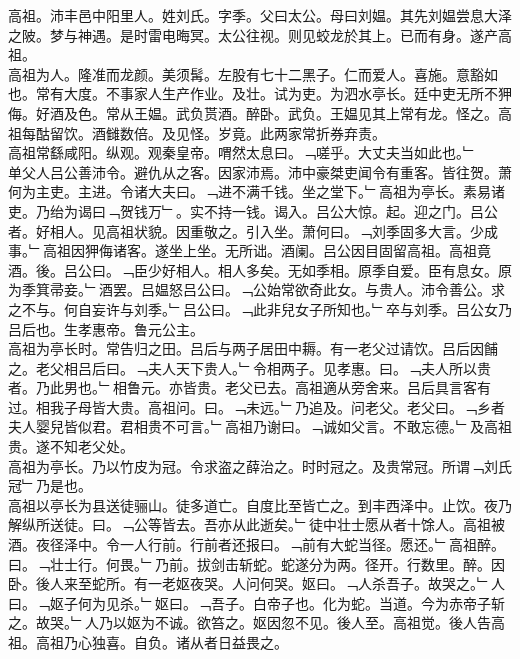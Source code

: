 \documentclass{zhvt-classic}
\begin{document}
\hspace*{2em}高祖。沛丰邑中阳里人。姓刘氏。字季。父曰太公。母曰刘媪。其先刘媪尝息大泽之陂。梦与神遇。是时雷电晦冥。太公往视。则见蛟龙於其上。已而有身。遂产高祖。\\
\hspace*{2em}高祖为人。隆准而龙颜。美须髯。左股有七十二黑子。仁而爱人。喜施。意豁如也。常有大度。不事家人生产作业。及壮。试为吏。为泗水亭长。廷中吏无所不狎侮。好酒及色。常从王媪。武负贳酒。醉卧。武负。王媪见其上常有龙。怪之。高祖每酤留饮。酒雠数倍。及见怪。岁竟。此两家常折券弃责。\\
\hspace*{2em}高祖常繇咸阳。纵观。观秦皇帝。喟然太息曰。﹁嗟乎。大丈夫当如此也。﹂\\
\hspace*{2em}单父人吕公善沛令。避仇从之客。因家沛焉。沛中豪桀吏闻令有重客。皆往贺。萧何为主吏。主进。令诸大夫曰。﹁进不满千钱。坐之堂下。﹂高祖为亭长。素易诸吏。乃绐为谒曰﹁贺钱万﹂。实不持一钱。谒入。吕公大惊。起。迎之门。吕公者。好相人。见高祖状貌。因重敬之。引入坐。萧何曰。﹁刘季固多大言。少成事。﹂高祖因狎侮诸客。遂坐上坐。无所诎。酒阑。吕公因目固留高祖。高祖竟酒。後。吕公曰。﹁臣少好相人。相人多矣。无如季相。原季自爱。臣有息女。原为季箕帚妾。﹂酒罢。吕媪怒吕公曰。﹁公始常欲奇此女。与贵人。沛令善公。求之不与。何自妄许与刘季。﹂吕公曰。﹁此非兒女子所知也。﹂卒与刘季。吕公女乃吕后也。生孝惠帝。鲁元公主。\\
\hspace*{2em}高祖为亭长时。常告归之田。吕后与两子居田中耨。有一老父过请饮。吕后因餔之。老父相吕后曰。﹁夫人天下贵人。﹂令相两子。见孝惠。曰。﹁夫人所以贵者。乃此男也。﹂相鲁元。亦皆贵。老父已去。高祖適从旁舍来。吕后具言客有过。相我子母皆大贵。高祖问。曰。﹁未远。﹂乃追及。问老父。老父曰。﹁乡者夫人婴兒皆似君。君相贵不可言。﹂高祖乃谢曰。﹁诚如父言。不敢忘德。﹂及高祖贵。遂不知老父处。\\
\hspace*{2em}高祖为亭长。乃以竹皮为冠。令求盗之薛治之。时时冠之。及贵常冠。所谓﹁刘氏冠﹂乃是也。\\
\hspace*{2em}高祖以亭长为县送徒骊山。徒多道亡。自度比至皆亡之。到丰西泽中。止饮。夜乃解纵所送徒。曰。﹁公等皆去。吾亦从此逝矣。﹂徒中壮士愿从者十馀人。高祖被酒。夜径泽中。令一人行前。行前者还报曰。﹁前有大蛇当径。愿还。﹂高祖醉。曰。﹁壮士行。何畏。﹂乃前。拔剑击斩蛇。蛇遂分为两。径开。行数里。醉。因卧。後人来至蛇所。有一老妪夜哭。人问何哭。妪曰。﹁人杀吾子。故哭之。﹂人曰。﹁妪子何为见杀。﹂妪曰。﹁吾子。白帝子也。化为蛇。当道。今为赤帝子斩之。故哭。﹂人乃以妪为不诚。欲笞之。妪因忽不见。後人至。高祖觉。後人告高祖。高祖乃心独喜。自负。诸从者日益畏之。\\
\end{document}
